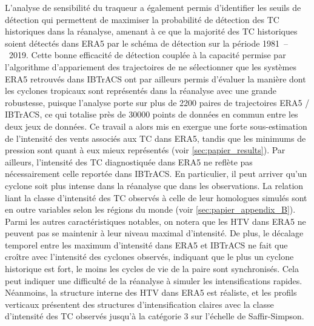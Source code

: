 \documentclass[../main.tex]{subfiles}
\begin{document}
L'analyse de sensibilité du traqueur a également permis d'identifier les seuils de détection qui permettent de maximiser la probabilité de détection des TC
historiques dans la réanalyse, amenant à ce que la majorité des TC historiques soient détectés dans ERA5 par le schéma de détection sur la période
\num{1981}~--~\num{2019}. Cette bonne efficacité de détection couplée à la capacité permise par l'algorithme d'appariement des trajectoires de ne sélectionner
que les systèmes ERA5 retrouvés dans IBTrACS ont par ailleurs permis d'évaluer la manière dont les cyclones tropicaux sont représentés dans la réanalyse avec
une grande robustesse, puisque l'analyse porte sur plus de \num{2200} paires de trajectoires ERA5 / IBTrACS, ce qui totalise près de \num{30000} points de
données en commun entre les deux jeux de données. Ce travail a alors mis en exergue une forte sous-estimation de l'intensité des vents associés aux TC dans
ERA5, tandis que les minimums de pression sont quant à eux mieux représentés (voir \cref{sec:papier_results}). Par ailleurs, l'intensité des TC diagnostiquée dans ERA5 ne
reflète pas nécessairement celle reportée dans IBTrACS. En particulier, il peut arriver qu'un cyclone soit plus intense dans la réanalyse que dans les observations. La
relation liant la classe d'intensité des TC observés à celle de leur homologues simulés sont en outre variables selon les régions du monde (voir
\cref{sec:papier_appendix_B}). Parmi les autres caractéristiques notables, on notera que les HTV dans ERA5 ne peuvent pas se maintenir à leur niveau maximal
d'intensité. De plus, le décalage temporel entre les maximum d'intensité dans ERA5 et IBTrACS ne fait que croître avec l'intensité des cyclones observés,
indiquant que le plus un cyclone historique est fort, le moins les cycles de vie de la paire sont synchronisés. Cela peut indiquer une difficulté de la
réanalyse à simuler les intensifications rapides. Néanmoins, la structure interne des HTV dans ERA5 est réaliste, et les profils verticaux présentent des
structures d'intensification claires avec la classe d'intensité des TC observés jusqu'à la catégorie 3 sur l'échelle de Saffir-Simpson.
\end{document}
